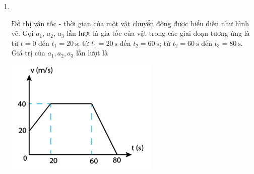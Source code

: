 \begin{enumerate}[label=\bfseries Câu \arabic*:]
\item {}\\
{\begin{minipage}[l]{0.7\textwidth}
		Đồ thị vận tốc - thời gian của một vật chuyển động được biểu diễn như hình vẽ. Gọi $a_1$, $a_2$, $a_3$ lần lượt là gia tốc của vật trong các giai đoạn tương ứng là từ $t = 0$ đến $t_1 = \SI{20}{\second}$; từ $t_1 =\SI{20}{\second}$ đến $t_2 =\SI{60}{\second}$; từ $t_2 = \SI{60}{\second}$ đến $t_3 = \SI{80}{\second}$. Giá trị của $a_1, a_2, a_3$ lần lượt là
	\end{minipage}
	\begin{minipage}{0.3\textwidth}
		\begin{center}
			\includegraphics[width=1.0\linewidth]{../figs/VN10-2022-PH-TP008-P-5}
		\end{center}
	\end{minipage}
}


\end{enumerate}
